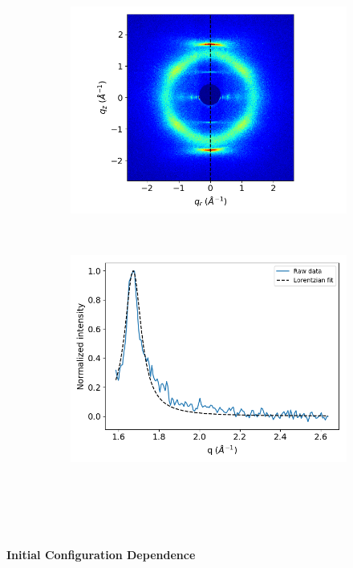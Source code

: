\documentclass{article}
\begin{document}
  \begin{figure}[h]
  \centering
  \begin{subfigure}{0.45\textwidth}	
  	\includegraphics[width=\textwidth]{waxs_dashed.png}
	\caption{}~\label{fig:waxs_dashed}
  \end{subfigure}
  \begin{subfigure}{0.45\textwidth}
	\includegraphics[width=\textwidth]{Correlation_length_exp.png}
	\caption{}~\label{fig:correlation_length_exp}
  \end{subfigure}
  \caption{}~\label{fig:correlation}
  \end{figure}
  \vspace{1em} \\
  \begingroup
	\fontsize{14pt}{12pt}\selectfont
	\textbf{Initial Configuration Dependence}
  \endgroup
\end{document}
